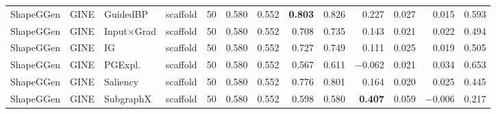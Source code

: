 \begin{table}[t]
{\begin{tabular}{lllcrrrrrrrrr}
ShapeGGen & GINE & GuidedBP & scaffold & 50 & 0.580 & 0.552 & \textbf{0.803} & 0.826 & 0.227 & 0.027 & 0.015 & 0.593 \\
ShapeGGen & GINE & Input$\times$Grad & scaffold & 50 & 0.580 & 0.552 & 0.708 & 0.735 & 0.143 & 0.021 & 0.022 & 0.494 \\
ShapeGGen & GINE & IG & scaffold & 50 & 0.580 & 0.552 & 0.727 & 0.749 & 0.111 & 0.025 & 0.019 & 0.505 \\
ShapeGGen & GINE & PGExpl. & scaffold & 50 & 0.580 & 0.552 & 0.567 & 0.611 & $-$0.062 & 0.021 & 0.034 & 0.653 \\
ShapeGGen & GINE & Saliency & scaffold & 50 & 0.580 & 0.552 & 0.776 & 0.801 & 0.164 & 0.020 & 0.025 & 0.445 \\
ShapeGGen & GINE & SubgraphX & scaffold & 50 & 0.580 & 0.552 & 0.598 & 0.580 & \textbf{0.407} & 0.059 & $-$0.006 & 0.217 \\
\bottomrule
\end{tabular}}
\end{table}
